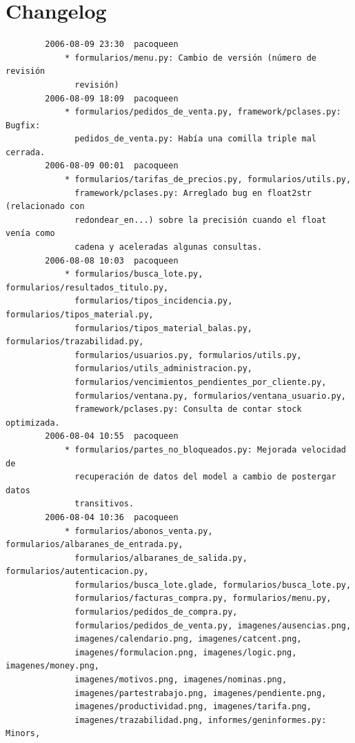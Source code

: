 \documentclass[a4paper]{article}
\begin{document}
    \section{Changelog}
\scriptsize %
        \begin{verbatim}
        2006-08-09 23:30  pacoqueen
            * formularios/menu.py: Cambio de versión (número de revisión
              revisión)
        2006-08-09 18:09  pacoqueen
            * formularios/pedidos_de_venta.py, framework/pclases.py: Bugfix:
              pedidos_de_venta.py: Había una comilla triple mal cerrada.
        2006-08-09 00:01  pacoqueen
            * formularios/tarifas_de_precios.py, formularios/utils.py,
              framework/pclases.py: Arreglado bug en float2str (relacionado con
              redondear_en...) sobre la precisión cuando el float venía como
              cadena y aceleradas algunas consultas.
        2006-08-08 10:03  pacoqueen
            * formularios/busca_lote.py, formularios/resultados_titulo.py,
              formularios/tipos_incidencia.py, formularios/tipos_material.py,
              formularios/tipos_material_balas.py, formularios/trazabilidad.py,
              formularios/usuarios.py, formularios/utils.py,
              formularios/utils_administracion.py,
              formularios/vencimientos_pendientes_por_cliente.py,
              formularios/ventana.py, formularios/ventana_usuario.py,
              framework/pclases.py: Consulta de contar stock optimizada.
        2006-08-04 10:55  pacoqueen
            * formularios/partes_no_bloqueados.py: Mejorada velocidad de
              recuperación de datos del model a cambio de postergar datos
              transitivos.
        2006-08-04 10:36  pacoqueen
            * formularios/abonos_venta.py, formularios/albaranes_de_entrada.py,
              formularios/albaranes_de_salida.py, formularios/autenticacion.py,
              formularios/busca_lote.glade, formularios/busca_lote.py,
              formularios/facturas_compra.py, formularios/menu.py,
              formularios/pedidos_de_compra.py,
              formularios/pedidos_de_venta.py, imagenes/ausencias.png,
              imagenes/calendario.png, imagenes/catcent.png,
              imagenes/formulacion.png, imagenes/logic.png, imagenes/money.png,
              imagenes/motivos.png, imagenes/nominas.png,
              imagenes/partestrabajo.png, imagenes/pendiente.png,
              imagenes/productividad.png, imagenes/tarifa.png,
              imagenes/trazabilidad.png, informes/geninformes.py: Minors,

\end{verbatim}
\end{document}
